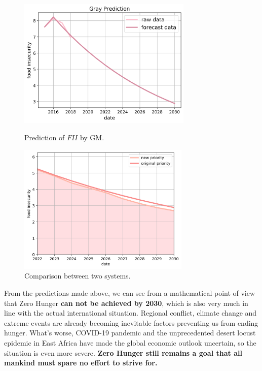 \documentclass{mcmthesis}
\begin{document}
\begin{figure}[H]
    \begin{minipage}[c]{0.5\textwidth}
       \centering
       \includegraphics[height=6.2cm]{gray.png}
       \caption{Prediction of $FII$ by GM.}
       \label{fig:gray}
       \end{minipage}
    \begin{minipage}[c]{0.5\textwidth}
       \centering
       \includegraphics[height=6.2cm]{unsafe.png}
       \caption{Comparison between two systems.}
        \label{fig:FII}
       \end{minipage}
\end{figure}

 

From the predictions made above, we can see from a mathematical point of view that Zero Hunger\textbf{ can not be achieved by 2030}, which is also very much in line with the actual international situation. Regional conflict, climate change and extreme events are already becoming inevitable factors preventing us from ending hunger. What's worse, COVID-19 pandemic and the unprecedented desert locust epidemic in East Africa have made the global economic outlook uncertain, so the situation is even more severe\cite{pdf}.\textbf{ Zero Hunger still remains a goal that all mankind must spare no effort to strive for.}
\end{document}
